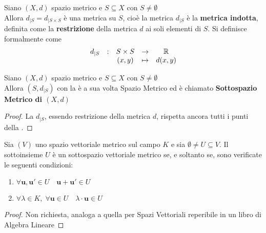 \begin{definition}
	\label{def:metr_indotta}
	Siano $(X,d)$ spazio metrico e $S \subseteq X$ con $S \neq \emptyset$\\
	Allora $d_{|S} = d_{|S \times S}$ è una metrica su $S$, cioè la metrica $d_{|S}$ è la \textbf{metrica indotta}, definita come la \textbf{restrizione} della metrica $d$ ai soli elementi di $S$. Si definisce formalmente come
	$$\begin{array}{ccccc} {d_{|S}} & : & {S \times S} & \to & {\mathbb{R}} \\ & & {(x,y)} & \mapsto & {d(x,y)} \\ \end{array}$$
\end{definition}

\begin{definition}
	Siano $(X,d)$ spazio metrico e $S \subseteq X$ con $S \neq \emptyset$\\
	Allora $(S,d_{|S})$ con la  è a sua volta Spazio Metrico ed è chiamato \textbf{Sottospazio Metrico di $(X,d)$}
	\begin{proof}
		La $d_{|S}$, essendo restrizione della metrica $d$, rispetta ancora tutti i punti della .
	\end{proof}
\end{definition}

\begin{proposition}
	\label{prop:subspace_condition}
	Sia $(V)$ uno spazio vettoriale metrico sul campo $K$ e sia $\emptyset \neq U \subseteq V$. Il sottoinsieme $U$ è un sottospazio vettoriale metrico se, e soltanto se, sono verificate le seguenti condizioni:
	\begin{enumerate}
		\item $\forall \mathbf{u}, \mathbf{u'} \in U \quad \mathbf{u} + \mathbf{u'} \in U$
		\item $\forall \lambda \in K,\; \forall \mathbf{u} \in U \quad \lambda \cdot \mathbf{u} \in U$
	\end{enumerate}
	\begin{proof}
		Non richiesta, analoga a quella per Spazi Vettoriali reperibile in un libro di Algebra Lineare
	\end{proof}
\end{proposition}

